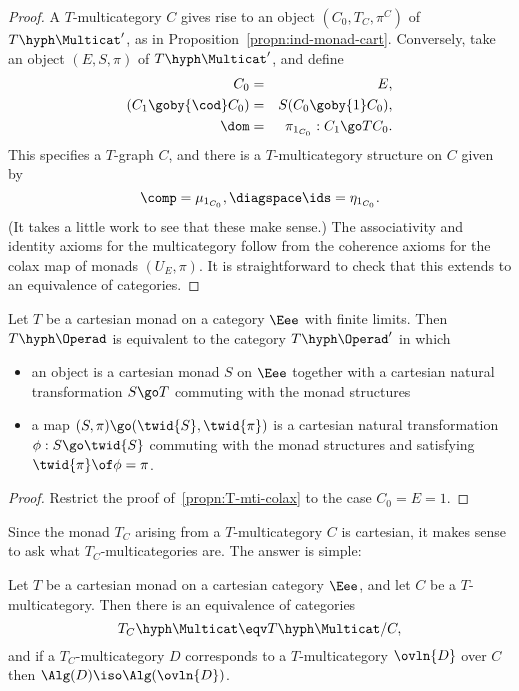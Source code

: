 \begin{proof}
A $T$-multicategory $C$ gives rise to an object $(C_0, T_C, \pi^C)$ of
$T\hyph\Multicat'$, as in Proposition~\ref{propn:ind-monad-cart}.
Conversely, take an object $(E, S, \pi)$ of $T\hyph\Multicat'$, and define
%
\begin{eqnarray*}
C_0			&=	&E,					\\
(C_1 \goby{\cod} C_0)	&=	&S(C_0 \goby{1} C_0),			\\
\dom			&= 	&\pi_{1_{C_0}}: C_1 \go TC_0.
\end{eqnarray*}
%
This specifies a $T$-graph $C$, and there is a $T$-multicategory structure
on $C$ given by
\[
\comp = \mu_{1_{C_0}},
\diagspace
\ids = \eta_{1_{C_0}}.
\]
(It takes a little work to see that these make sense.)  The associativity
and identity axioms for the multicategory follow from the coherence axioms
for the colax map of monads $(U_E, \pi)$.  It is straightforward to check
that this extends to an equivalence of categories.
\done
\end{proof}

\begin{cor}	
Let $T$ be a cartesian monad on a category $\Eee$ with finite
limits.  Then $T\hyph\Operad$ is equivalent to the category
$T\hyph\Operad'$ in which
%
\begin{itemize}
\item an object is a cartesian monad $S$ on $\Eee$ together with a
cartesian natural transformation $S \go T$ commuting with the monad
structures
\item a map $(S, \pi) \go (\twid{S}, \twid{\pi})$ is a cartesian natural
transformation $\phi: S \go \twid{S}$ commuting with the monad structures
and satisfying $\twid{\pi} \of \phi = \pi$.
\end{itemize}
\end{cor}
%
\begin{proof}
Restrict the proof of~\ref{propn:T-mti-colax} to the case $C_0=E=1$.
\done
\end{proof}

Since the monad $T_C$ arising from a $T$-multicategory $C$ is cartesian, it
makes sense to ask what $T_C$-multicategories are.  The answer is simple:
%
\begin{cor}	
Let $T$ be a cartesian monad on a cartesian category $\Eee$, and let $C$ be
a $T$-multicategory.  Then there is an equivalence of categories
\[
T_C\hyph\Multicat \eqv T\hyph\Multicat/C,
\]
and if a $T_C$-multicategory $D$ corresponds to a $T$-multicategory
$\ovln{D}$ over $C$ then $\Alg(D) \iso \Alg(\ovln{D})$.
\end{cor}


